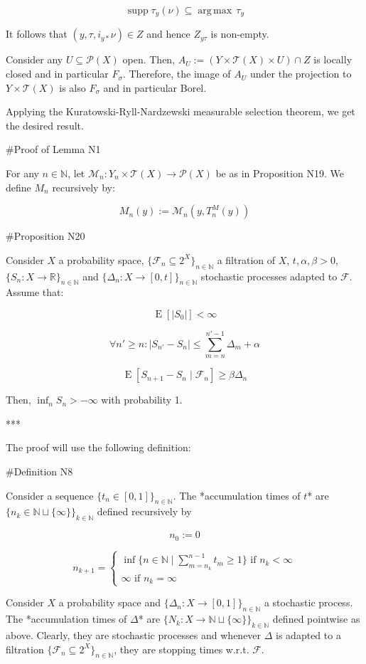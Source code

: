 \documentclass[a4paper]{article}
\DeclareMathOperator{\Supp}{supp}
\DeclareMathOperator{\E}{E}
\newcommand{\Argmax}[1]{\underset{#1}{\operatorname{arg\,max}}\,}
\newcommand{\Nats}{\mathbb{N}}
\newcommand{\Reals}{\mathbb{R}}
\newcommand{\Sq}[2]{\{#1\}_{#2 \in \Nats}}
\newcommand{\Sqn}[1]{\Sq{#1}{n}}
\newcommand{\Abs}[1]{\lvert #1 \rvert}
\newcommand{\Prob}{\mathcal{P}}
\newcommand{\T}{\mathcal{T}}
\newcommand{\F}{\mathcal{F}}
\begin{document}
$$\Supp \tau_y(\nu) \subseteq \Argmax{} \tau_y$$

It follows that ${(y,\tau,i_{y*}\nu) \in Z}$ and hence ${Z_{y\tau}}$ is non-empty.

Consider any ${U \subseteq \Prob(X)}$ open. Then, ${A_U:=(Y \times \T(X) \times U) \cap Z}$ is locally closed and in particular ${F_\sigma}$. Therefore, the image of ${A_U}$ under the projection to ${Y \times \T(X)}$ is also ${F_\sigma}$ and in particular Borel. 

Applying the Kuratowski-Ryll-Nardzewski measurable selection theorem, we get the desired result.

\#Proof of Lemma N1

For any ${n \in \Nats}$, let ${\mathcal{M}_n: Y_n \times \T(X) \rightarrow \Prob(X)}$ be as in Proposition N19. We define ${M_n}$ recursively by:

$$M_n(y):=\mathcal{M}_n(y,T_n^M(y))$$

\#Proposition N20

Consider ${X}$ a probability space, ${\{\F_n \subseteq 2^X\}_{n \in \Nats}}$ a filtration of ${X}$, ${t,\alpha,\beta > 0}$, ${\{S_n:X \rightarrow \Reals\}_{n \in \Nats}}$ and ${\{\Delta_n:X \rightarrow [0,t]\}_{n \in \Nats}}$ stochastic processes adapted to ${\F}$. Assume that:

$$\E[\Abs{S_0}] < \infty$$

$$\forall n' \geq n:\Abs{S_{n'}-S_{n}} \leq \sum_{m=n}^{n'-1} \Delta_m + \alpha$$

$$\E[S_{n+1} - S_n \mid \F_n] \geq \beta \Delta_n$$

Then, ${\inf_{n} S_n > -\infty}$ with probability 1.

***

The proof will use the following definition:

\#Definition N8

Consider a sequence ${\Sqn{t_n \in [0,1]}}$. The *accumulation times of ${t}$* are ${\Sq{n_k \in \Nats \sqcup \{\infty\}}{k}}$ defined recursively by

$$n_0 := 0$$

$$n_{k+1} = \begin{cases}\inf \{n \in \Nats \mid \sum_{m=n_k}^{n-1} t_m \geq 1\} \text{ if } n_k < \infty\\\infty \text{ if } n_k = \infty\end{cases}$$

Consider ${X}$ a probability space and ${\{\Delta_n:X \rightarrow [0,1]\}_{n \in \Nats}}$ a stochastic process. The *accumulation times of ${\Delta}$* are ${\{N_k: X \rightarrow \Nats \sqcup \{\infty\}\}_{k \in \Nats}}$ defined pointwise as above. Clearly, they are stochastic processes and whenever ${\Delta}$ is adapted to a filtration ${\Sqn{\F_n \subseteq 2^X}}$, they are stopping times w.r.t. ${\F}$.
\end{document}
